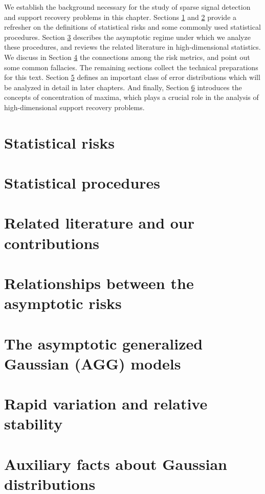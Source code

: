 
We establish the background necessary for the study of sparse signal detection and support recovery problems in this chapter.
Sections \ref{sec:risks} and \ref{sec:statistical-procedures} provide a refresher on the definitions of statistical risks and some commonly used statistical procedures.
Section \ref{sec:asymptotics} describes the asymptotic regime under which we analyze these procedures, and reviews the related literature in high-dimensional statistics.
We discuss in Section \ref{sec:risks-relations} the connections among the risk metrics, and point out some common fallacies.
The remaining sections collect the technical preparations for this text.
Section \ref{suppsec:AGG} defines an important class of error distributions which will be analyzed in detail in later chapters. 
And finally, Section \ref{subsec:RS} introduces the concepts of concentration of maxima, which plays a crucial role in the analysis of high-dimensional support recovery problems.


\section{Statistical risks}
\label{sec:risks}


\section{Statistical procedures}
\label{sec:statistical-procedures}


\section{Related literature and our contributions}
\label{sec:asymptotics}


\section{Relationships between the asymptotic risks}
\label{sec:risks-relations}


\section{The asymptotic generalized Gaussian (AGG) models}
\label{suppsec:AGG}


\section{Rapid variation and relative stability}
\label{subsec:RS}


\section{Auxiliary facts about Gaussian distributions}
 \label{sec:Guassian}
 